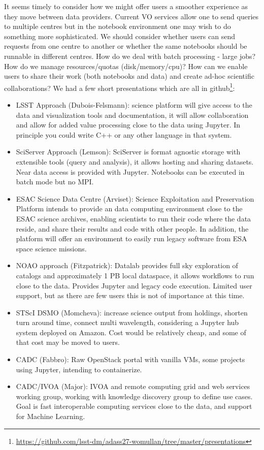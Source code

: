 \documentclass[11pt,twoside]{article}
\begin{document}
It seems timely to consider how we might offer users a smoother experience as they move between data providers.
Current VO services allow one to send queries to multiple centres but in the notebook environment one may wish to do something more sophisticated. We should consider whether users can send requests from one centre to another or whether the same notebooks should be runnable in different centres.
How do we deal with batch processing - large jobs? How do we manage resources/quotas (disk/memory/cpu)?  How can we enable users to share their work (both notebooks and data) and create ad-hoc scientific collaborations?
We had a few short presentations which are all in github\footnote{\url{https://github.com/lsst-dm/adass27-womullan/tree/master/presentations}}:
\begin{itemize}
\item LSST Approach (Dubois-Felsmann): science platform will give access to the data and visualization tools and documentation, it will allow collaboration and allow for added value processing close to the data using Jupyter. In principle you could write C++ or any other language in that system.

\item SciServer Approach (Lemson): SciServer is format agnostic storage with extensible tools (query and analysis), it allows hosting and sharing datasets. Near data access is provided with Jupyter. Notebooks can be executed in batch mode but no MPI.

\item ESAC Science Data Centre (Arviset): Science Exploitation and Preservation Platform intends to provide an data computing environment close to the ESAC science archives, enabling scientists to run their code where the data reside, and share their results and code with other people. In addition, the platform will offer an environment to easily run legacy software from ESA space science missions.


\item NOAO approach (Fitzpatrick): Datalab provides full sky exploration of catalogs and approximately 1 PB local dataspace, it allows workflows to run close to the data. Provides Jupyter and legacy code execution. Limited user support, but as there are few users this is not of importance at this time.
\item STScI DSMO (Momcheva): increase science output from holdings, shorten turn around time, connect multi wavelength, considering a Jupyter hub system deployed on Amazon. Cost would be relatively cheap, and some of that cost may be moved to users.

\item CADC (Fabbro): Raw OpenStack portal with vanilla VMs, some projects using Jupyter, intending to containerize.

\item CADC/IVOA (Major): IVOA and remote computing grid and web services working group, working with knowledge discovery group to define use cases.
Goal is fast interoperable computing services close to the data, and support for Machine Learning.
\end{itemize}
\end{document}
